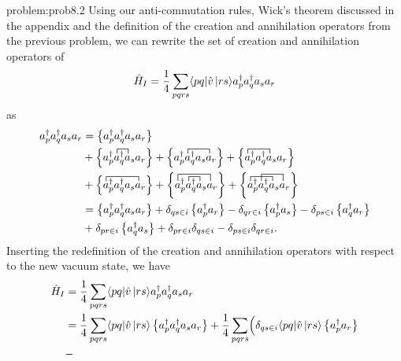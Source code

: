 \begin{prob}
  \begin{sol}{problem:prob8.2}
  Using our anti-commutation rules, Wick's theorem discussed in the
  appendix and the definition of the creation and annihilation
  operators from the previous problem, we can rewrite the set of
  creation and annihilation operators of
      \begin{equation*}
          \hat{H}_I = \frac{1}{4} \sum_{pqrs}
          \langle pq|\hat{v}\,|{rs}\rangle a^\dagger_p a^\dagger_q a_s a_r
      \end{equation*}
  as
  \begin{align*}
      a^\dagger_p a^\dagger_q a_s a_r &=\normord{a^\dagger_p
        a^\dagger_q a_s a_r} \\ & + \normord{
        \contraction{a^\dagger_p}{a}{{}^\dagger_q}{a}a^\dagger_p
        a^\dagger_q a_s a_r}+
      \normord{\contraction{a^\dagger_p}{a}{{}^\dagger_q a_s}{a}
        a^\dagger_p a^\dagger_q a_s a_r}+
      \normord{\contraction{}{a}{{}^\dagger_p
          a^\dagger_q}{a}a^\dagger_p a^\dagger_q a_s a_r} \\ & +
      \normord{\contraction{}{a}{{}^\dagger_p a^\dagger_q
          a_s}{a}a^\dagger_p a^\dagger_q a_s a_r}+
      \normord{\contraction[1.5ex]{}{a}{{}^\dagger_p a_q^\dagger
          a_s}{a}
        \contraction{a^\dagger_p}{a}{{}^\dagger_q}{a}a^\dagger_p
        a^\dagger_q a_s a_r}+ \normord{\contraction{}{a}{{}^\dagger_p
          a_q^\dagger}{a}\contraction[1.5ex]{a^\dagger_p}{a}{{}^\dagger_q
          a_s}{a}a^\dagger_p a^\dagger_q a_s a_r} \\ &=
      \normord{a^\dagger_p a^\dagger_q a_s a_r}+ \delta_{qs\in i}
      \normord{ a^\dagger_p a_r}- \delta_{qr \in i}
      \normord{a^\dagger_p a_s} - \delta_{ps \in i}
      \normord{a^\dagger_q a_r}\\ & + \delta_{pr \in i}
      \normord{a^\dagger_q a_s} + \delta_{pr \in i} \delta_{qs \in i}
      - \delta_{ps \in i} \delta_{qr \in i}.
  \end{align*}
   Inserting the redefinition of the creation and annihilation
   operators with respect to the new vacuum state, we have
      \begin{align*}
      \hat{H}_I &= \frac{1}{4} \sum_{pqrs} \element{pq}{\hat{v}}{rs}
      a^\dagger_p a^\dagger_q a_s a_r \\ &= \frac{1}{4} \sum_{pqrs}
      \element{pq}{\hat{v}}{rs} \normord{a^\dagger_p a^\dagger_q a_s
        a_r} + \frac{1}{4} \sum_{pqrs} \Bigl( \delta_{qs\in i}
      \element{pq}{\hat{v}}{rs} \normord{ a^\dagger_p a_r}\\ & -

\end{align*}
\end{sol}
\end{prob}
